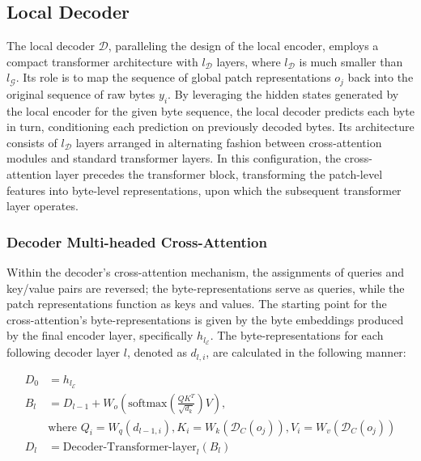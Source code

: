 \subsection{Local Decoder} 

The local decoder $\mathcal{D}$, paralleling the design of the local encoder, employs a compact transformer architecture with $l_{\mathcal{D}}$ layers, where $l_{\mathcal{D}}$ is much smaller than $l_{\mathcal{G}}$. Its role is to map the sequence of global patch representations $o_j$ back into the original sequence of raw bytes $y_i$. By leveraging the hidden states generated by the local encoder for the given byte sequence, the local decoder predicts each byte in turn, conditioning each prediction on previously decoded bytes. Its architecture consists of $l_{\mathcal{D}}$ layers arranged in alternating fashion between cross-attention modules and standard transformer layers. In this configuration, the cross-attention layer precedes the transformer block, transforming the patch-level features into byte-level representations, upon which the subsequent transformer layer operates.

\subsubsection{Decoder Multi-headed Cross-Attention} 

Within the decoder's cross-attention mechanism, the assignments of queries and key/value pairs are reversed; the byte-representations serve as queries, while the patch representations function as keys and values. The starting point for the cross-attention's byte-representations is given by the byte embeddings produced by the final encoder layer, specifically $h_{l_{\mathcal{E}}}$. The byte-representations for each following decoder layer $l$, denoted as $d_{l,i}$, are calculated in the following manner:

\begin{align}
D_0 &= h_{l_{\mathcal{E}}} \\
B_l &= D_{l-1} + W_o\left(\text{softmax}\left(\frac{QK^T}{\sqrt{d_k}}\right)V\right), \\
  &\text{where } Q_i = W_q(d_{l-1,i}), K_i = W_k(\mathcal{D}_C(o_j)), V_i = W_v(\mathcal{D}_C(o_j)) \\
  D_l &= \text{Decoder-Transformer-layer}_l(B_l)
\end{align}

